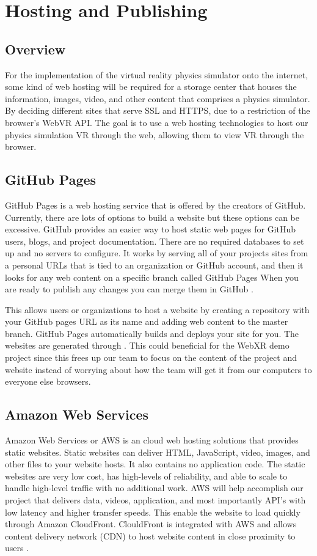 \section{Hosting and Publishing}
\subsection{Overview}
For the implementation of the virtual reality physics simulator onto the internet, some kind of web hosting will be required for a storage center that houses the information, images, video, and other content that comprises a physics simulator. By deciding different sites that serve SSL and HTTPS, due to a restriction of the browser's WebVR API. The goal is to use a web hosting technologies to host our physics simulation VR through the web, allowing them to view VR through the browser.

\subsection{GitHub Pages}
GitHub Pages is a web hosting service that is offered by the creators of GitHub. Currently, there are lots of options to build a website but these options can be excessive. GitHub provides an easier way to host static web pages for GitHub users, blogs, and project documentation. There are no required databases to set up and no servers to configure. It works by serving all of your projects sites from a personal URLs that is tied to an organization or GitHub account, and then it looks for any web content on a specific branch called GitHub Pages When you are ready to publish any changes you can merge them in GitHub \cite{aframe}.

This allows users or organizations to host a website by creating a repository with your GitHub pages URL as its name and adding web content to the master branch. GitHub Pages automatically builds and deploys your site for you. The websites are generated through \cite{aframe}. This could beneficial for the WebXR demo project since this frees up our team to focus on the content of the project and website instead of worrying about how the team will get it from our computers to everyone else browsers.

\subsection{Amazon Web Services}
Amazon Web Services or AWS is an cloud web hosting solutions that provides static websites. Static websites can deliver HTML, JavaScript, video, images, and other files to your website hosts. It also contains no application code. The static websites are very low cost, has high-levels of reliability, and able to scale to handle high-level traffic with no additional work. AWS will help accomplish our project that delivers data, videos, application, and most importantly API's with low latency and higher transfer speeds. This enable the website to load quickly through Amazon CloudFront. ClouldFront is integrated with AWS and allows content delivery network (CDN) to host website content in close proximity to users \cite{aws}.


